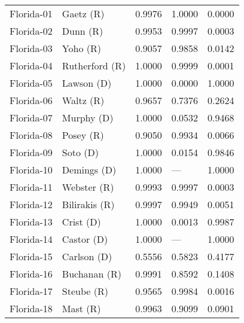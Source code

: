 \begin{longtable}{llrll}
        Florida-01 &            {\color{Red} Gaetz (R)} &       0.9976 &        1.0000 &        0.0000 \\
        Florida-02 &             {\color{Red} Dunn (R)} &       0.9953 &        0.9997 &        0.0003 \\
        Florida-03 &             {\color{Red} Yoho (R)} &       0.9057 &        0.9858 &        0.0142 \\
        Florida-04 &       {\color{Red} Rutherford (R)} &       1.0000 &        0.9999 &        0.0001 \\
        Florida-05 &          {\color{Blue} Lawson (D)} &       1.0000 &        0.0000 &        1.0000 \\
        Florida-06 &            {\color{Red} Waltz (R)} &       0.9657 &        0.7376 &        0.2624 \\
        Florida-07 &          {\color{Blue} Murphy (D)} &       1.0000 &        0.0532 &        0.9468 \\
        Florida-08 &            {\color{Red} Posey (R)} &       0.9050 &        0.9934 &        0.0066 \\
        Florida-09 &            {\color{Blue} Soto (D)} &       1.0000 &        0.0154 &        0.9846 \\
        Florida-10 &         {\color{Blue} Demings (D)} &       1.0000 &           --- &        1.0000 \\
        Florida-11 &          {\color{Red} Webster (R)} &       0.9993 &        0.9997 &        0.0003 \\
        Florida-12 &        {\color{Red} Bilirakis (R)} &       0.9997 &        0.9949 &        0.0051 \\
        Florida-13 &           {\color{Blue} Crist (D)} &       1.0000 &        0.0013 &        0.9987 \\
        Florida-14 &          {\color{Blue} Castor (D)} &       1.0000 &           --- &        1.0000 \\
        Florida-15 &         {\color{Blue} Carlson (D)} &       0.5556 &        0.5823 &        0.4177 \\
        Florida-16 &         {\color{Red} Buchanan (R)} &       0.9991 &        0.8592 &        0.1408 \\
        Florida-17 &           {\color{Red} Steube (R)} &       0.9565 &        0.9984 &        0.0016 \\
        Florida-18 &             {\color{Red} Mast (R)} &       0.9963 &        0.9099 &        0.0901 \\

\end{longtable}

